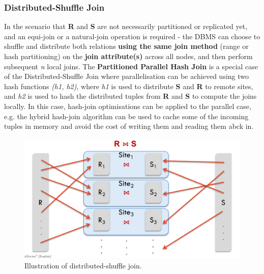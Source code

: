 \subsubsection{Distributed-Shuffle Join}
In the scenario that \textbf{R} and \textbf{S} are not necessarily partitioned or replicated yet, and an equi-join or a natural-join operation is required - the DBMS can choose to shuffle and distribute both relations \textbf{using the same join method} (range or hash partitioning) on the \textbf{join attribute(s)} across all nodes, and then perform subsequent \textit{n} local joins. The \textbf{Partitioned Parallel Hash Join} is a special case of the Distributed-Shuffle Join where parallelisation can be achieved using two hash functions \textit{(h1, h2)}, where \textit{h1} is used to distribute \textbf{S} and \textbf{R} to remote sites, and \textit{h2} is used to hash the distributed tuples from \textbf{R} and \textbf{S} to compute the joins locally. In this case, hash-join optimisations can be applied to the parallel case, e.g. the hybrid hash-join algorithm can be used to cache some of the incoming tuples in memory and avoid the cost of writing them and reading them abck in. 

\begin{figure}[h]
  \centering
  \includegraphics[width=\linewidth]{figures/shuffle-join.png}
  \caption{Illustration of distributed-shuffle join.}
  \label{fig:shuffle-join}
\end{figure}

